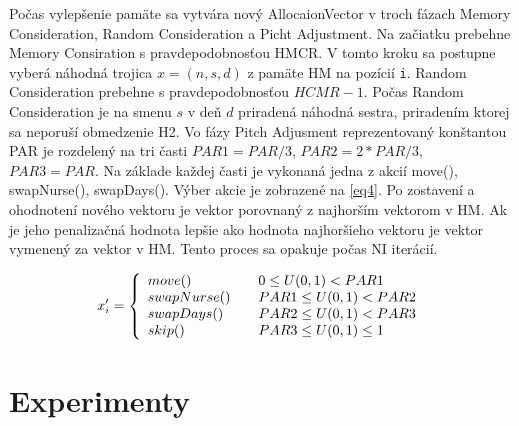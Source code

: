 \documentclass[a4paper, 14pt]{article}
\begin{document}
Počas vylepšenie pamäte sa vytvára nový AllocaionVector v troch fázach Memory Consideration, Random Consideration a Picht Adjustment. Na začiatku prebehne Memory Consiration s pravdepodobnosťou HMCR. V tomto kroku sa postupne vyberá náhodná trojica $x = (n,s,d)$ z pamäte HM na pozícií \texttt{i}. Random Consideration prebehne s pravdepodobnosťou $HCMR - 1$. Počas Random Consideration je na smenu $s$ v deň $d$ priradená náhodná sestra, priradením ktorej sa neporuší obmedzenie H2. Vo fázy Pitch Adjusment reprezentovaný konštantou PAR je rozdelený na tri časti $PAR1 = PAR/3$, $PAR2 = 2*PAR/3$, $PAR3 = PAR$.  Na základe každej časti je vykonaná jedna z akcií move(), swapNurse(), swapDays(). Výber akcie je zobrazené na \ref{eq4}. Po zostavení a ohodnotení nového vektoru je vektor porovnaný z najhorším vektorom v HM. Ak je jeho penalizačná hodnota lepšie ako hodnota najhoršieho vektoru je vektor vymenený za vektor v HM. Tento proces sa opakuje počas NI iterácií. 

\begin{center}
\begin{eqnarray}
\label{eq4}
x'_i = \left\{ 
\begin{array}{l l}
  move() & \quad \mbox  {$0  \leq U(0,1) < PAR1$}\\
  swapNurse() & \quad \mbox{$PAR1 \leq U(0,1) < PAR2$}\\
  swapDays() & \quad \mbox{$PAR2 \leq U(0,1) < PAR3$}\\
  skip() & \quad \mbox{$PAR3 \leq U(0,1) \leq 1$}\\
\end{array} \right. 
\end{eqnarray}
\end{center}  













\section{Experimenty}
\end{document}
